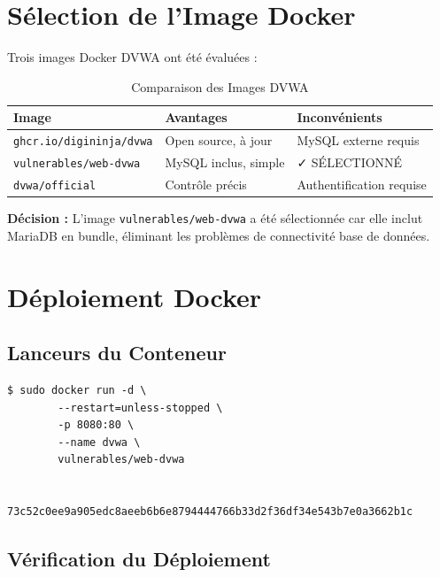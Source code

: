 \documentclass[12pt,a4paper,openany]{report}
\begin{document}
	\section{Sélection de l'Image Docker}
	
	Trois images Docker DVWA ont été évaluées :
	
	\begin{table}[ht]
		\centering
		\small
		\renewcommand{\arraystretch}{1.6}
		\begin{tabular}{p{3cm} p{4cm} p{5cm}}
			\hline
			\rowcolor{tableheadbg}
			\textcolor{tableheadfg}{\textbf{Image}} &
			\textcolor{tableheadfg}{\textbf{Avantages}} &
			\textcolor{tableheadfg}{\textbf{Inconvénients}} \\
			\hline
			\rowcolor{tablerowalt}
			\texttt{ghcr.io/digininja/dvwa} & Open source, à jour & MySQL externe requis \\
			
			\texttt{vulnerables/web-dvwa} & MySQL inclus, simple & ✓ SÉLECTIONNÉ \\
			
			\rowcolor{tablerowalt}
			\texttt{dvwa/official} & Contrôle précis & Authentification requise \\
			\hline
		\end{tabular}
		\caption{Comparaison des Images DVWA}
		\label{tab:dvwa-images}
	\end{table}
	
	\textbf{Décision :} L'image \texttt{vulnerables/web-dvwa} a été sélectionnée car elle inclut MariaDB 
	en bundle, éliminant les problèmes de connectivité base de données.
	
	\section{Déploiement Docker}
	
	\subsection{Lanceurs du Conteneur}
	
	\begin{lstlisting}[caption=Démarrage du Conteneur DVWA]
		$ sudo docker run -d \
		--restart=unless-stopped \
		-p 8080:80 \
		--name dvwa \
		vulnerables/web-dvwa
		
		73c52c0ee9a905edc8aeeb6b6e8794444766b33d2f36df34e543b7e0a3662b1c
	\end{lstlisting}
	
	\subsection{Vérification du Déploiement}
	
\end{document}
